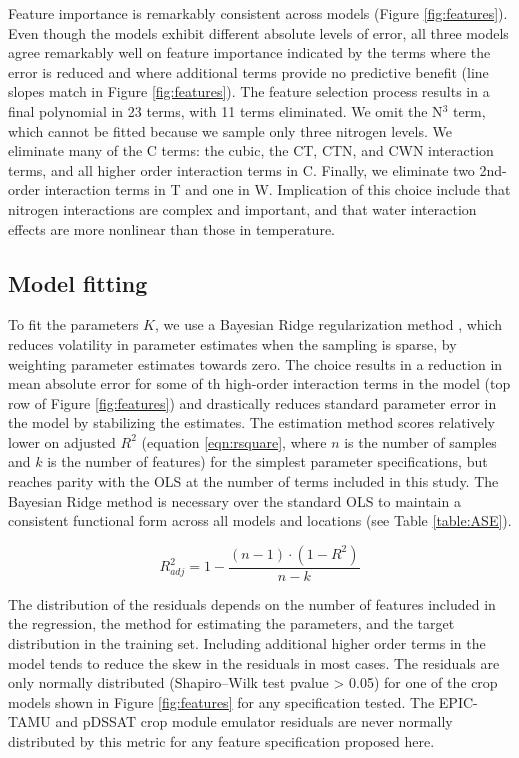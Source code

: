 \documentclass[gmd, manuscript]{copernicus} %
\begin{document}
Feature importance is remarkably consistent across models (Figure \ref{fig:features}). 
Even though the models exhibit different absolute levels of error, all three models agree remarkably well on feature importance indicated by the terms where the error is reduced and where additional terms provide no predictive benefit (line slopes match in Figure \ref{fig:features}). 
The feature selection process results in a final polynomial in 23 terms, with 11 terms eliminated. 
We omit the N$^3$ term, which cannot be fitted because we sample only three nitrogen levels. 
We eliminate many of the C terms: the cubic, the CT, CTN, and CWN interaction terms, and all higher order interaction terms in C. 
Finally, we eliminate two 2nd-order interaction terms in T and one in W. 
Implication of this choice include that nitrogen interactions are complex and important, and that water interaction effects are more nonlinear than those in temperature. 

\subsection{Model fitting}
To fit the parameters $K$, we use a Bayesian Ridge regularization method \citep{MacKay91}, which reduces volatility in parameter estimates when the sampling is sparse, by weighting parameter estimates towards zero. 
The choice results in a reduction in mean absolute error for some of th high-order interaction terms in the model (top row of Figure \ref{fig:features}) and drastically reduces standard parameter error in the model by stabilizing the estimates.
The estimation method scores relatively lower on adjusted $R^2$ (equation \ref{eqn:rsquare}, where $n$ is the number of samples and $k$ is the number of features) for the simplest parameter specifications, but reaches parity with the OLS at the number of terms included in this study.
The Bayesian Ridge method is necessary over the standard OLS to maintain a consistent functional form across all models and locations (see Table \ref{table:ASE}). 

\begin{equation}
    \label{eqn:rsquare}
    R^{2}_{adj} = 1 - \frac{(n-1) \cdot (1 - R^{2})}{n - k}
\end{equation}

The distribution of the residuals depends on the number of features included in the regression, the method for estimating the parameters, and the target distribution in the training set. 
Including additional higher order terms in the model tends to reduce the skew in the residuals in most cases.
The residuals are only normally distributed (Shapiro–Wilk test \citep{Shapiro1965} pvalue > 0.05) for one of the crop models shown in Figure \ref{fig:features} for any specification tested.
The EPIC-TAMU and pDSSAT crop module emulator residuals are never normally distributed by this metric for any feature specification proposed here. 
\end{document}
